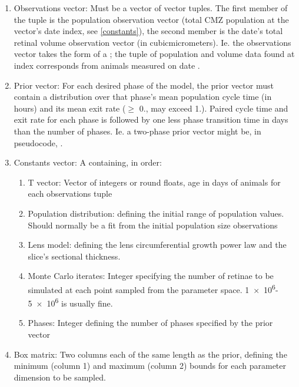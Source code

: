 \begin{enumerate}
    \item Observations vector: Must be a vector of vector tuples. The first member of the tuple is the population observation vector (total CMZ population at the vector's date index, see \ref{constants}), the second member is the date's total retinal volume observation vector (in \si{cubic}{micro}{meters}). Ie. the observations vector takes the form of a ; the tuple of population and volume data found at index  corresponds from animals measured on date .
    \item Prior vector: For each desired phase of the model, the prior vector must contain a distribution over that phase's mean population cycle time (in hours) and its mean exit rate ($\geq$ 0., may exceed 1.). Paired cycle time and exit rate for each phase is followed by one less phase transition time in days than the number of phases. Ie. a two-phase prior vector might be, in pseudocode, . 
    \item\label{constants} Constants vector: A  containing, in order:
    \begin{enumerate}
        \item T vector: Vector of integers or round floats, age in days of animals for each observations tuple
        \item Population distribution:  defining the initial range of population values. Should normally be a fit from the initial population size observations
        \item Lens model:   defining the lens circumferential growth power law and the slice's sectional thickness.
        \item Monte Carlo iterates: Integer specifying the number of retinae to be simulated at each point sampled from the parameter space. \num{1e6}-\num{5e6} is usually fine.
        \item Phases: Integer defining the number of phases specified by the prior vector
    \end{enumerate}
    \item Box matrix: Two columns each of the same length as the prior, defining the minimum (column 1) and maximum (column 2) bounds for each parameter dimension to be sampled.
\end{enumerate}

